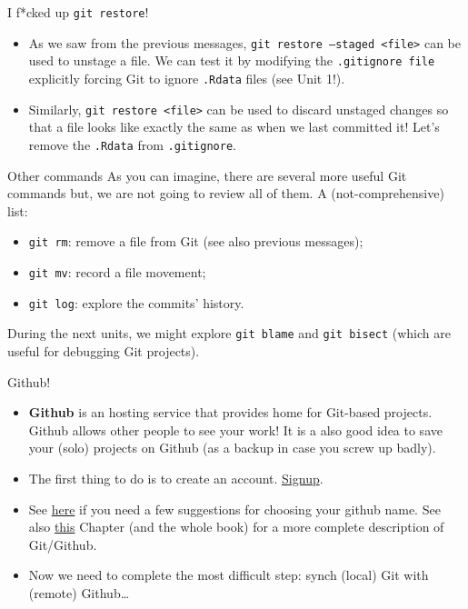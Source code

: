 \documentclass[
hyperref={bookmarks=false},
xcolor={dvipsnames,svgnames*,x11names*}, 
12pt
]{beamer}
\begin{document}
\begin{frame}[fragile]{I f*cked up  \texttt{git restore}!}
\vspace{-0.5cm}
\begin{itemize}
\itemsep 2ex
\item As we saw from the previous messages, \texttt{git restore --staged <file>} can be used to unstage a file. We can test it by modifying the \texttt{.gitignore file} explicitly forcing Git to ignore \texttt{.Rdata} files (see Unit 1!).
\item Similarly, \texttt{git restore <file>} can be used to discard unstaged changes so that a file looks like exactly the same as when we last committed it! Let's remove the \texttt{.Rdata} from \texttt{.gitignore}. 
\end{itemize}
\end{frame}

\begin{frame}{Other commands}
\vspace{-0.5cm}
As you can imagine, there are several more useful Git commands but, we are not going to review all of them. A (not-comprehensive) list: 
\begin{itemize}
\itemsep 2ex
\item \texttt{git rm}: remove a file from Git (see also previous messages); 
\item \texttt{git mv}: record a file movement; 
\item \texttt{git log}: explore the commits' history.
\end{itemize}
During the next units, we might explore \texttt{git blame} and \texttt{git bisect} (which are useful for debugging Git projects). 
\end{frame}

\begin{frame}{Github!}
\vspace{-0.5cm}
\begin{itemize}
\itemsep 2ex
\item \textbf{Github} is an hosting service that provides home for Git-based projects. Github allows other people to see your work! It is a also good idea to save your (solo) projects on Github (as a backup in case you screw up badly). 
\item The first thing to do is to create an account. \href{https://github.com/signup?ref_cta=Sign+up\&ref_loc=header+logged+out\&ref_page=\%2F\&source=header-home}{Signup}. 
\item See \href{https://happygitwithr.com/github-acct.html}{here} if you need a few suggestions for choosing your github name. See also \href{https://happygitwithr.com/big-picture.html}{this} Chapter (and the whole book) for a more complete description of Git/Github.  
\item Now we need to complete the most difficult step: synch (local) Git with (remote) Github\dots
\end{itemize}
\end{frame}
\end{document}
